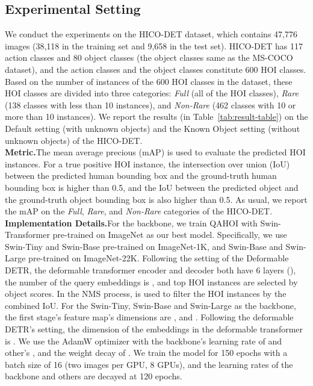 \documentclass[10pt,twocolumn,letterpaper]{article}
\begin{document}
\subsection{Experimental Setting}
\space We conduct the experiments on the HICO-DET \cite{chao2018learning} dataset,
which contains 47,776 images (38,118 in the training set and 9,658 in the test set).
HICO-DET has 117 action classes and 80 object classes (the object classes same as the MS-COCO \cite{lin2014microsoft} dataset),
and the action classes and the object classes constitute 600 HOI classes.
Based on the number of instances of the 600 HOI classes in the dataset, these HOI classes are divided into three categories:
{\em Full} (all of the HOI classes), {\em Rare} (138 classes with less than 10 instances), and {\em Non-Rare} (462 classes with 10 or more than 10 instances).
We report the results (in Table~\ref{tab:result-table}) on the Default setting (with unknown objects) and the Known Object setting (without unknown objects) of the HICO-DET.
\\
{\bf Metric.}\space The mean average precious (mAP) is used to evaluate the predicted HOI instances.
For a true positive HOI instance,
the intersection over union (IoU) between the predicted human bounding box and the ground-truth human bounding box is higher than 0.5,
and the IoU between the predicted object and the ground-truth object bounding box is also higher than 0.5.
As usual, we report the mAP on the {\em Full}, {\em Rare}, and {\em Non-Rare} categories of the HICO-DET.
\\
{\bf Implementation Details.}\space For the backbone, we train QAHOI with Swin-Transformer \cite{liu2021swin} pre-trained on ImageNet \cite{deng2009imagenet} as our best model.
Specifically, we use Swin-Tiny and Swin-Base pre-trained on ImageNet-1K, and Swin-Base and Swin-Large pre-trained on ImageNet-22K.
Following the setting of the Deformable DETR, the deformable transformer encoder and decoder both have 6 layers (),
the number of the query embeddings is , and top  HOI instances are selected by object scores.
In the NMS process,  is used to filter the HOI instances by the combined IoU.
For the Swin-Tiny, Swin-Base and Swin-Large as the backbone, the first stage's feature map's dimensions are ,  and .
Following the deformable DETR's setting, the dimension of the embeddings in the deformable transformer is .
We use the AdamW \cite{loshchilov2018decoupled} optimizer with the backbone's learning rate of  and other's , and the weight decay of . 
We train the model for 150 epochs with a batch size of 16 (two images per GPU, 8 GPUs),
and the learning rates of the backbone and others are decayed at 120 epochs.
\end{document}

